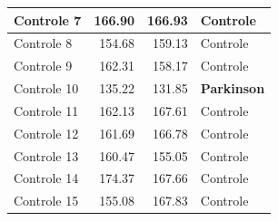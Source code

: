 \begin{table}[!h]
\begin{tabular}{|l|l|l|l|}
Controle 7         & \multicolumn{1}{r|}{166.90}                                                          & \multicolumn{1}{r|}{166.93}                                                          & Controle                                                            \\ \hline
Controle 8         & \multicolumn{1}{r|}{154.68}                                                          & \multicolumn{1}{r|}{159.13}                                                          & Controle                                                            \\ \hline
Controle 9         & \multicolumn{1}{r|}{162.31}                                                          & \multicolumn{1}{r|}{158.17}                                                          & Controle                                                            \\ \hline
Controle 10         & \multicolumn{1}{r|}{135.22}                                                          & \multicolumn{1}{r|}{131.85}                                                          & \textbf{Parkinson}                                                            \\ \hline
Controle 11         & \multicolumn{1}{r|}{162.13}                                                          & \multicolumn{1}{r|}{167.61}                                                          & Controle                                                            \\ \hline
Controle 12         & \multicolumn{1}{r|}{161.69}                                                          & \multicolumn{1}{r|}{166.78}                                                          & Controle                                                            \\ \hline
Controle 13         & \multicolumn{1}{r|}{160.47}                                                          & \multicolumn{1}{r|}{155.05}                                                          & Controle                                                            \\ \hline
Controle 14         & \multicolumn{1}{r|}{174.37}                                                          & \multicolumn{1}{r|}{167.66}                                                          & Controle                                                            \\ \hline
Controle 15         & \multicolumn{1}{r|}{155.08}                                                          & \multicolumn{1}{r|}{167.83}                                                          & Controle                                                            \\ \hline

\end{tabular}
\end{table}
